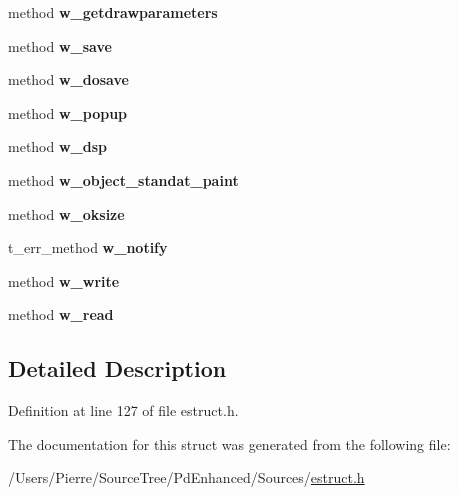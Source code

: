 \begin{DoxyCompactItemize}
\item 
\hypertarget{struct__ewidget_a5eb6013a425a581ee41c734f44eb5255}{method {\bfseries w\-\_\-getdrawparameters}}\label{struct__ewidget_a5eb6013a425a581ee41c734f44eb5255}

\item 
\hypertarget{struct__ewidget_a18f2be4123b21b24c9f2673d22eea9fb}{method {\bfseries w\-\_\-save}}\label{struct__ewidget_a18f2be4123b21b24c9f2673d22eea9fb}

\item 
\hypertarget{struct__ewidget_aed0f8446884595a1091cae24873ddc39}{method {\bfseries w\-\_\-dosave}}\label{struct__ewidget_aed0f8446884595a1091cae24873ddc39}

\item 
\hypertarget{struct__ewidget_ad375827ec0dc5f2c712ba6f51608a44a}{method {\bfseries w\-\_\-popup}}\label{struct__ewidget_ad375827ec0dc5f2c712ba6f51608a44a}

\item 
\hypertarget{struct__ewidget_a6a3bf35bdca1508f50b885654b8fa8a1}{method {\bfseries w\-\_\-dsp}}\label{struct__ewidget_a6a3bf35bdca1508f50b885654b8fa8a1}

\item 
\hypertarget{struct__ewidget_a96ed05177c8899ca783c09f55229fc36}{method {\bfseries w\-\_\-object\-\_\-standat\-\_\-paint}}\label{struct__ewidget_a96ed05177c8899ca783c09f55229fc36}

\item 
\hypertarget{struct__ewidget_aef2440efc520270b766899eac0c50eaa}{method {\bfseries w\-\_\-oksize}}\label{struct__ewidget_aef2440efc520270b766899eac0c50eaa}

\item 
\hypertarget{struct__ewidget_ad60d080025f2fca515c7346761c0ded7}{t\-\_\-err\-\_\-method {\bfseries w\-\_\-notify}}\label{struct__ewidget_ad60d080025f2fca515c7346761c0ded7}

\item 
\hypertarget{struct__ewidget_a41f7c60b430e128c02fb13ffc5c9199d}{method {\bfseries w\-\_\-write}}\label{struct__ewidget_a41f7c60b430e128c02fb13ffc5c9199d}

\item 
\hypertarget{struct__ewidget_a08b27e9cb459b88a9418c61ac25e75df}{method {\bfseries w\-\_\-read}}\label{struct__ewidget_a08b27e9cb459b88a9418c61ac25e75df}

\end{DoxyCompactItemize}


\subsection{Detailed Description}


Definition at line 127 of file estruct.\-h.



The documentation for this struct was generated from the following file\-:\begin{DoxyCompactItemize}
\item 
/\-Users/\-Pierre/\-Source\-Tree/\-Pd\-Enhanced/\-Sources/\hyperlink{estruct_8h}{estruct.\-h}\end{DoxyCompactItemize}
